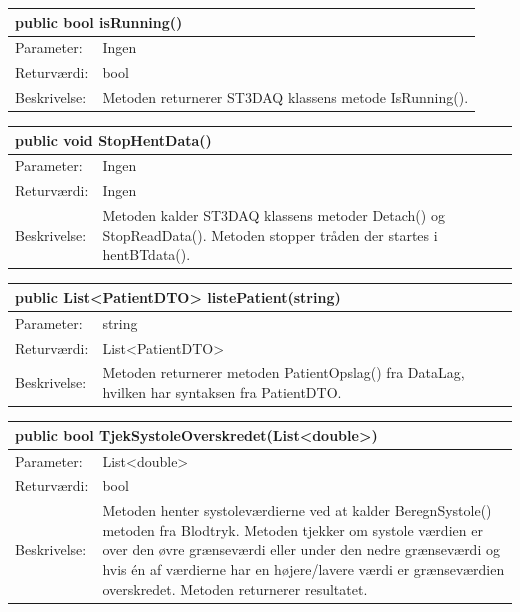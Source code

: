 \begin{table}[H]
\label{tab:tabel2}
\begin{tabular}{| l | p{13cm} |}
   \hline
   \multicolumn{2}{|l|}{public bool isRunning()} \\ \hline
   Parameter: & Ingen\\ \hline
   Returværdi: & bool\\ \hline
   Beskrivelse: & Metoden returnerer ST3DAQ klassens metode IsRunning(). \\ \hline
\end{tabular}
\end{table}
\begin{table}[H]
\label{tab:tabel2}
\begin{tabular}{| l | p{13cm} |}
   \hline
   \multicolumn{2}{|l|}{public void StopHentData()} \\ \hline
   Parameter: & Ingen\\ \hline
   Returværdi: & Ingen\\ \hline
   Beskrivelse: & Metoden kalder ST3DAQ klassens metoder Detach() og StopReadData(). Metoden stopper tråden der startes i hentBTdata(). \\ \hline
\end{tabular}
\end{table}
\begin{table}[H]
\label{tab:tabel2}
\begin{tabular}{| l | p{13cm} |}
   \hline
   \multicolumn{2}{|l|}{public List<PatientDTO> listePatient(string)} \\ \hline
   Parameter: & string\\ \hline
   Returværdi: & List<PatientDTO>\\ \hline
   Beskrivelse: & Metoden returnerer metoden PatientOpslag() fra DataLag, hvilken har syntaksen fra PatientDTO.\\ \hline
\end{tabular}
\end{table}
\begin{table}[H]
\label{tab:tabel2}
\begin{tabular}{| l | p{13cm} |}
   \hline
   \multicolumn{2}{|l|}{public bool TjekSystoleOverskredet(List<double>)} \\ \hline
   Parameter: & List<double>\\ \hline
   Returværdi: & bool\\ \hline
   Beskrivelse: & Metoden henter systoleværdierne ved at kalder BeregnSystole() metoden fra Blodtryk. Metoden tjekker om systole værdien er over den øvre grænseværdi eller under den nedre grænseværdi og hvis én af værdierne har en højere/lavere værdi er grænseværdien overskredet. Metoden returnerer resultatet. \\ \hline
\end{tabular}
\end{table}
